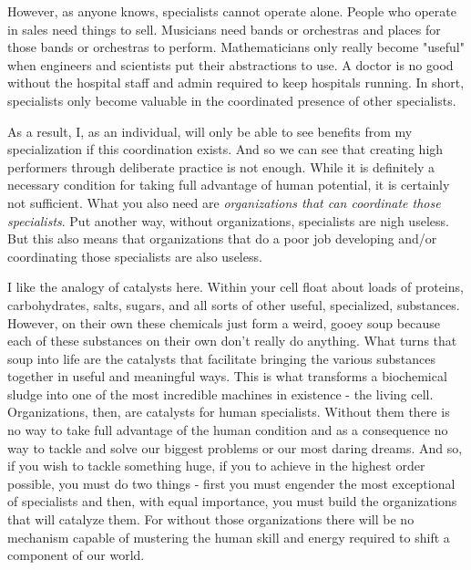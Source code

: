 \documentclass[11pt]{book}
\begin{document}
However, as anyone knows, specialists cannot operate alone. People who operate in sales need things to sell. Musicians need bands or orchestras and places for those bands or orchestras to perform. Mathematicians only really become "useful" when engineers and scientists put their abstractions to use. A doctor is no good without the hospital staff and admin required to keep hospitals running. In short, specialists only become valuable in the coordinated presence of other specialists.
\newline

As a result, I, as an individual, will only be able to see benefits from my specialization if this coordination exists. And so we can see that creating high performers through deliberate practice is not enough. While it is definitely a necessary condition for taking full advantage of human potential, it is certainly not sufficient. What you also need are \textit{organizations that can coordinate those specialists}. Put another way, without organizations, specialists are nigh useless. But this also means that organizations that do a poor job developing and/or coordinating those specialists are also useless. 
\newline 

I like the analogy of catalysts here. Within your cell float about loads of proteins, carbohydrates, salts, sugars, and all sorts of other useful, specialized, substances. However, on their own these chemicals just form a weird, gooey soup because each of these substances on their own don't really do anything. What turns that soup into life are the catalysts that facilitate bringing the various substances together in useful and meaningful ways. This is what transforms a biochemical sludge into one of the most incredible machines in existence - the living cell. Organizations, then, are catalysts for human specialists. Without them there is no way to take full advantage of the human condition and as a consequence no way to tackle and solve our biggest problems or our most daring dreams. And so, if you wish to tackle something huge, if you to achieve in the highest order possible, you must do two things - first you must engender the most exceptional of specialists and then, with equal importance, you must build the organizations that will catalyze them. For without those organizations there will be no mechanism capable of mustering the human skill and energy required to shift a component of our world.

\nocite{duckworth} \nocite{outliers}
\end{document}
